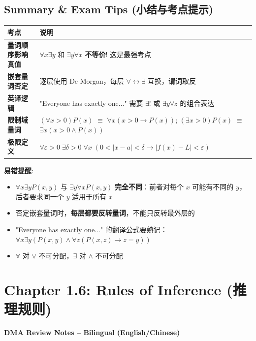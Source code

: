 \documentclass[10pt,a4paper,openany]{ctexbook}
\theoremstyle{definition}
\theoremstyle{remark}
\renewenvironment{quote}
  {\list{}{\leftmargin=1em\rightmargin=0pt\topsep=0.5pt\partopsep=0pt}\item[]}
  {\endlist}
\begin{document}
\vspace{-2pt}

\subsection{Summary \& Exam Tips (小结与考点提示)}

\begin{center}
\begin{tabular}{ll}
\hline
考点 & 说明 \\ \hline
\textbf{量词顺序影响真值} & $\forall x \exists y$ 和 $\exists y \forall x$ \textbf{不等价}! 这是最强考点 \\
\textbf{嵌套量词否定} & 逐层使用 De Morgan，每层 $\forall \leftrightarrow \exists$ 互换，谓词取反 \\
\textbf{英译逻辑} & "Everyone has exactly one..." 需要 $\exists!$ 或 $\exists y \forall z$ 的组合表达 \\
\textbf{限制域量词} & $(\forall x > 0)P(x)$ $\equiv$ $\forall x (x > 0 \to P(x))$; $(\exists x > 0)P(x)$ $\equiv$ $\exists x (x > 0 \land P(x))$ \\
\textbf{极限定义} & $\forall \varepsilon > 0 \; \exists \delta > 0 \; \forall x \; (0<|x-a|<\delta \to |f(x)-L|<\varepsilon)$ \\
\hline
\end{tabular}

\end{center}

\textbf{易错提醒}:
\begin{itemize}
\item $\forall x \exists y P(x,y)$ 与 $\exists y \forall x P(x,y)$ \textbf{完全不同}：前者对每个 $x$ 可能有不同的 $y$，后者要求同一个 $y$ 适用于所有 $x$
\item 否定嵌套量词时，\textbf{每层都要反转量词}，不能只反转最外层的
\item "Everyone has exactly one..." 的翻译公式要熟记：$\forall x \exists y (P(x,y) \land \forall z (P(x,z) \to z = y))$
\item $\forall$ 对 $\lor$ 不可分配，$\exists$ 对 $\land$ 不可分配

\end{itemize}


\section{Chapter 1.6: Rules of Inference (推理规则)}

\begin{quote}
\textbf{DMA Review Notes -- Bilingual (English/Chinese)}

\end{quote}
\vspace{-2pt}
\end{document}

